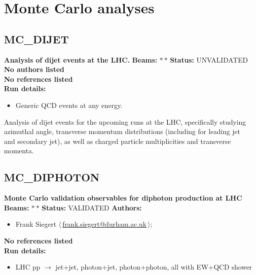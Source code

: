 \clearpage


\section{Monte Carlo analyses}\subsection{MC\_DIJET}
\textbf{Analysis of dijet events at the LHC.}\newline
\textbf{Beams:} $*$\,$*$ \newline
\textbf{Status:} UNVALIDATED\newline
\textbf{No authors listed}\\ 
\textbf{No references listed}\\ 
\textbf{Run details:}
\begin{itemize}

  \item Generic QCD events at any energy.\end{itemize}

\noindent Analysis of dijet events for the upcoming runs at the LHC, specifically studying azimuthal angle, transverse momentum distributions (including for leading jet and secondary jet), as well as charged particle multiplicities and transverse momenta.

\clearpage


\clearpage

\subsection{MC\_DIPHOTON}
\textbf{Monte Carlo validation observables for diphoton production at LHC}\newline
\textbf{Beams:} $*$\,$*$ \newline
\textbf{Status:} VALIDATED\newline
\textbf{Authors:}
\begin{itemize}
  \item Frank Siegert $\langle\,$\href{mailto:frank.siegert@durham.ac.uk}{frank.siegert@durham.ac.uk}$\,\rangle$;
\end{itemize}
\textbf{No references listed}\\ 
\textbf{Run details:}
\begin{itemize}

  \item LHC pp \ensuremath{\to} jet+jet, photon+jet, photon+photon, all with EW+QCD shower\end{itemize}

